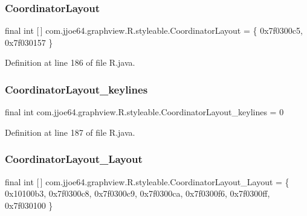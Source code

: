 \subsubsection{\texorpdfstring{CoordinatorLayout}{CoordinatorLayout}}
{\footnotesize\ttfamily final int \mbox{[}$\,$\mbox{]} com.\+jjoe64.\+graphview.\+R.\+styleable.\+Coordinator\+Layout = \{ 0x7f0300c5, 0x7f030157 \}\hspace{0.3cm}{\ttfamily [static]}}



Definition at line 186 of file R.\+java.

\mbox{\label{classcom_1_1jjoe64_1_1graphview_1_1_r_1_1styleable_a741a80a20a1bde314f6c3f4bbe97d94b}} 
\subsubsection{\texorpdfstring{CoordinatorLayout\_keylines}{CoordinatorLayout\_keylines}}
{\footnotesize\ttfamily final int com.\+jjoe64.\+graphview.\+R.\+styleable.\+Coordinator\+Layout\+\_\+keylines = 0\hspace{0.3cm}{\ttfamily [static]}}



Definition at line 187 of file R.\+java.

\mbox{\label{classcom_1_1jjoe64_1_1graphview_1_1_r_1_1styleable_a10d9fc725636b9fc682f9fba52e9d9f8}} 
\subsubsection{\texorpdfstring{CoordinatorLayout\_Layout}{CoordinatorLayout\_Layout}}
{\footnotesize\ttfamily final int \mbox{[}$\,$\mbox{]} com.\+jjoe64.\+graphview.\+R.\+styleable.\+Coordinator\+Layout\+\_\+\+Layout = \{ 0x10100b3, 0x7f0300c8, 0x7f0300c9, 0x7f0300ca, 0x7f0300f6, 0x7f0300ff, 0x7f030100 \}\hspace{0.3cm}{\ttfamily [static]}}




